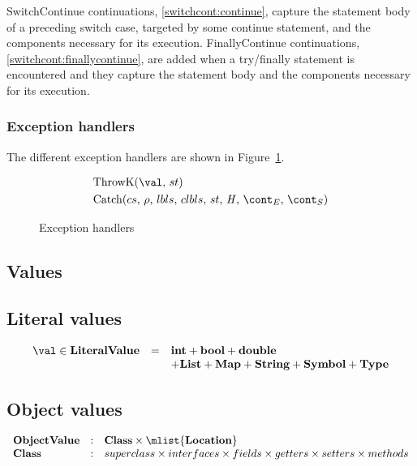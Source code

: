 \documentclass{article}
\begin{document}
SwitchContinue continuations, \ref{switchcont:continue}, capture the statement body of a preceding switch case, targeted by some continue statement, and the components necessary for its execution.
FinallyContinue continuations, \ref{switchcont:finallycontinue}, are added when a try/finally statement is encountered and they capture the statement body and the components necessary for its execution.
\subsubsection{Exception handlers}
\label{subsubsec:exception-handlers}
The different exception handlers are shown in Figure~\ref{figure:handlers}.
\newcommand{\ThrowH}[2]{\mathrm{ThrowK}({#1},\,{#2})}
\newcommand{\CatchH}[1]{\mathrm{Catch}({#1},\,\env,\,\lbls,\,\clbls,\,\strace,\,\handler,\,\econt,\,\scont)}

\begin{figure}[Htp]
  \begin{align}
    &\ThrowH{\val}{\strace} \label{handle:throw} \\
    &\CatchH{cs} \label{handle:catch}
  \end{align}
  \caption{Exception handlers}
  \label{figure:handlers}
\end{figure}

\subsection{Values}
\label{subsec:values}
\subsection{Literal values}
\label{subsubsec:literal-values}
\[
  \begin{array}{lcl}
	\val \in \dlitval &=& \mathbf{int} + \mathbf{bool} + \mathbf{double}\\
	&& + \mathbf{List} + \mathbf{Map} + \mathbf{String} + \mathbf{Symbol} + \mathbf{Type}
  \end{array}
\]
\subsection{Object values}
\label{subsec:object-values}
\[
  \begin{array}{lcl}
	\dobjval &:& \dclass \times \mlist{\dlocation}\\
	\dclass &:& superclass \times interfaces \times fields \times getters \times setters \times methods
  \end{array}
\]
\end{document}
